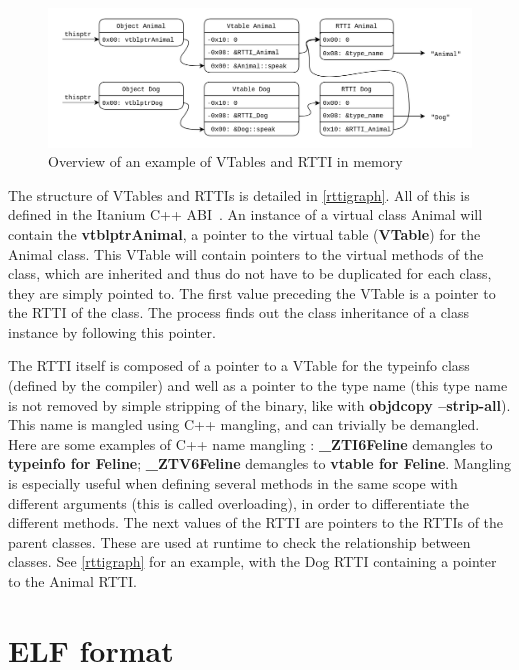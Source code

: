 \documentclass[a4paper,11pt,oneside]{report}
\begin{document}
\begin{figure}[h]

\includegraphics[width=16cm]{RTTI_graph.png}
\caption{Overview of an example of VTables and RTTI in memory}
\label{rttigraph}

\end{figure}

The structure of VTables and RTTIs is detailed in \autoref{rttigraph}.
All of this is defined in the Itanium C++ ABI~\cite{cppabi}.
An instance of a virtual class Animal will contain the \textbf{vtblptrAnimal}, a pointer to the virtual table (\textbf{VTable}) for the Animal class.
This VTable will contain pointers to the virtual methods of the class, which are inherited and thus do not have to be duplicated for each class, they are simply pointed to.
The first value preceding the VTable is a pointer to the RTTI of the class. The process finds out the class inheritance of a class instance by following this pointer.

The RTTI itself is composed of a pointer to a VTable for the typeinfo class (defined by the compiler) and well as a pointer to the type name (this type name is not removed by simple stripping of the binary, like with \textbf{objdcopy --strip-all}).
This name is mangled using C++ mangling, and can trivially be demangled.
Here are some examples of C++ name mangling :
\textbf{\_ZTI6Feline} demangles to \textbf{typeinfo for Feline};
\textbf{\_ZTV6Feline} demangles to \textbf{vtable for Feline}.
Mangling is especially useful when defining several methods in the same scope with different arguments (this is called overloading),
in order to differentiate the different methods.
The next values of the RTTI are pointers to the RTTIs of the parent classes.
These are used at runtime to check the relationship between classes.
See \autoref{rttigraph} for an example, with the Dog RTTI containing a pointer to the Animal RTTI.

\section{ELF format}
\end{document}
